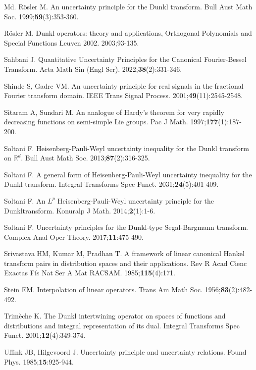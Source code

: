 \documentclass[12pt,a4paper,reqno]{amsproc}
\theoremstyle{definition}
\theoremstyle{remark}
\numberwithin{equation}{section}
\begin{document}
\begin{thebibliography}{Md.}
 R{\"o}sler M. An uncertainty principle for the Dunkl transform.  Bull Aust Math Soc. 1999;{\bf{59}}(3):353-360.

  R{\"o}sler M. Dunkl operators: theory and applications, Orthogonal Polynomials and Special Functions Leuven 2002. 2003;93-135.

 Sahbani J. Quantitative Uncertainty Principles for the Canonical Fourier-Bessel Transform. Acta Math Sin (Engl Ser). 2022;\textbf{38}(2):331-346.

 Shinde S, Gadre VM. An uncertainty principle for real signals in the fractional Fourier transform domain. IEEE Trans Signal Process. 2001;\textbf{49}(11):2545-2548.


 Sitaram A, Sundari M. An analogue of Hardy’s theorem for very rapidly decreasing functions on semi-simple Lie groups. Pac J Math. 1997;\textbf{177}(1):187-200.

 Soltani F. Heisenberg-Pauli-Weyl uncertainty inequality for the Dunkl transform on $\mathbb{R}^d$. Bull Aust
Math Soc. 2013;{\bf{87}}(2):316-325.

 Soltani F. A general form of Heisenberg-Pauli-Weyl uncertainty inequality for the Dunkl transform. Integral Transforms Spec Funct. 2031;{\bf{24}}(5):401-409.

 Soltani F. An $L^p$ Heisenberg-Pauli-Weyl uncertainty principle for the Dunkltransform. Konuralp J Math. 2014;{\bf{2}}(1):1-6.

 Soltani F. Uncertainty principles for the Dunkl-type Segal-Bargmann transform. Complex Anal Oper Theory. 2017;{\bf{11}}:475-490.

 Srivastava HM, Kumar M, Pradhan T. A framework of linear canonical Hankel transform pairs in distribution spaces and their applications. Rev R Acad Cienc Exactas F\'is Nat Ser A Mat RACSAM. 1985;\textbf{115}(4):171.

  Stein EM. Interpolation of linear operators. Trans Am Math Soc. 1956;{\bf{83}}(2):482-492.

  Trim{\`e}che K. The Dunkl intertwining operator on spaces of functions and distributions and integral representation of its dual.	 Integral Transforms Spec Funct. 2001;{\bf{12}}(4):349-374.

 Uffink JB,   Hilgevoord J. Uncertainty principle and uncertainty relations. Found Phys. 1985;\textbf{15}:925-944.
\end{thebibliography}
\end{document}
